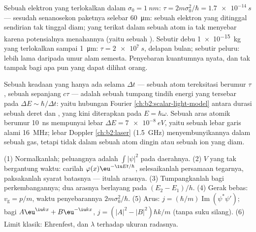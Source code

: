 \begin{example}\label{ex:b2:schrodinger-wave-functions:spreading}
Sebuah elektron yang terlokalkan dalam $\sigma_0 = \qty{1}{nm}$: $\tau = 2m\sigma_0^2/\hbar
= \qty{1.7e-14}{s}$ --- sesudah senanosekon paketnya selebar \qty{60}{\micro m}:
sebuah elektron yang ditinggal sendirian tak tinggal diam; yang terikat dalam sebuah atom ia
tak menyebar karena potensialnya menahannya (yaitu sebuah ).
Sebutir debu \qty{1e-15}{kg} yang terlokalkan sampai \qty{1}{\micro m}: $\tau =
\qty{2e7}{s}$, delapan bulan; sebutir peluru: lebih lama daripada umur alam semesta.
Penyebaran kuantumnya nyata, dan tak tampak bagi apa pun yang dapat dilihat orang.
\end{example}

\begin{remark}\label{rem:b2:schrodinger-wave-functions:energytime}
Sebuah keadaan yang hanya ada selama $\Delta t$ --- sebuah atom tereksitasi berumur
$\tau$, sebuah  sepanjang $c\tau$ --- adalah sebuah tumpang tindih energi
yang tersebar pada $\Delta E \sim \hbar/\Delta t$: yaitu hubungan Fourier
\cref{ch:b2:scalar-light-model} antara durasi sebuah deret dan
, yang kini diterapkan pada $E = \hbar\omega$. Sebuah aras atomik berumur
\qty{10}{ns} mempunyai lebar $\Delta E = \qty{7e-8}{eV}$, yaitu sebuah
lebar garis alami \qty{16}{MHz}; lebar Doppler \cref{ch:b2:laser}
(\qty{1.5}{GHz}) menyembunyikannya dalam sebuah gas, tetapi tidak dalam sebuah atom dingin atau sebuah ion yang
diam.
\end{remark}

\begin{method}\label{meth:b2:schrodinger-wave-functions:method}
(1) Normalkanlah; peluangnya adalah $\int|\psi|^2$ pada daerahnya. (2)
$V$ yang tak bergantung waktu: carilah $\varphi(x)\eu^{-\iu Et/\hbar}$, selesaikanlah
persamaan tegarnya, paksakanlah syarat batasnya --- itulah arasnya.
(3) Tumpangkanlah  bagi perkembangannya; dua arasnya berlayang pada
$(E_2 - E_1)/h$. (4) Gerak bebas: $v_{\text{g}} = p/m$, waktu penyebarannya
$2m\sigma_0^2/\hbar$. (5) Arus: $j = (\hbar/m)\operatorname{Im}(\psi^*\psi')$;
bagi $A\eu^{\iu kx} + B\eu^{-\iu kx}$, $j = (|A|^2 - |B|^2)\hbar k/m$ (tanpa suku silang).
(6) Limit klasik: Ehrenfest, dan $\lambda$ terhadap ukuran
radasnya.
\end{method}

